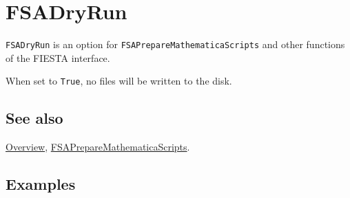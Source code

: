 \documentclass[../FeynHelpersManual.tex]{subfiles}
\begin{document}
\hypertarget{fsadryrun}{
\section{FSADryRun}\label{fsadryrun}}

\texttt{FSADryRun} is an option for
\texttt{FSAPrepareMathematicaScripts} and other functions of the FIESTA
interface.

When set to \texttt{True}, no files will be written to the disk.

\subsection{See also}

\hyperlink{toc}{Overview},
\hyperlink{fsapreparemathematicascripts}{FSAPrepareMathematicaScripts}.

\subsection{Examples}
\end{document}
